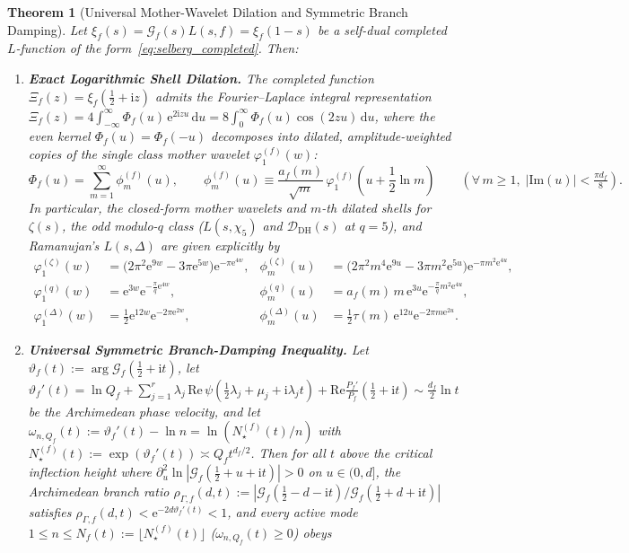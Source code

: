 \documentclass[11pt,reqno]{amsart}
\newtheorem{theorem}{Theorem}[section]
\theoremstyle{definition}
\theoremstyle{remark}
\numberwithin{equation}{section}
\newcommand{\dd}{\mathrm{d}}
\newcommand{\ee}{\mathrm{e}}
\newcommand{\ii}{\mathrm{i}}
\newcommand{\Rea}{\mathrm{Re}}
\newcommand{\Ima}{\mathrm{Im}}
\newcommand{\DHf}{\mathrm{DH}}
\begin{document}
\begin{theorem}[Universal Mother-Wavelet Dilation and Symmetric Branch Damping]\label{thm:mother_wavelet}
Let $\xi_f(s) = \mathcal{G}_f(s)L(s,f) = \xi_f(1-s)$ be a self-dual completed $L$-function of the form~\eqref{eq:selberg_completed}. Then:
\begin{enumerate}[label=\textup{(\roman*)},leftmargin=2.2em]
\item \textbf{Exact Logarithmic Shell Dilation.} The completed function $\Xi_f(z) = \xi_f(\frac{1}{2}+\ii z)$ admits the Fourier--Laplace integral representation $\Xi_f(z) = 4\int_{-\infty}^\infty \Phi_f(u)\,\ee^{2\ii zu}\,\dd u = 8\int_0^\infty \Phi_f(u)\cos(2zu)\,\dd u$, where the even kernel $\Phi_f(u) = \Phi_f(-u)$ decomposes into dilated, amplitude-weighted copies of the single class mother wavelet $\varphi_1^{(f)}(w)$:
\begin{equation}\label{eq:dilation_law}
\Phi_f(u) = \sum_{m=1}^{\infty} \phi_m^{(f)}(u), \qquad \phi_m^{(f)}(u) \equiv \frac{a_f(m)}{\sqrt{m}}\,\varphi_1^{(f)}\!\left(u + \frac{1}{2}\ln m\right) \qquad (\forall\,m \ge 1,\; |\Ima(u)| < \tfrac{\pi d_f}{8}).
\end{equation}
In particular, the closed-form mother wavelets and $m$-th dilated shells for $\zeta(s)$, the odd modulo-$q$ class ($L(s,\chi_5)$ and $\mathcal{D}_{\DHf}(s)$ at $q=5$), and Ramanujan's $L(s,\Delta)$ are given explicitly by
\begin{equation}\label{eq:three_mother_wavelets}
\begin{aligned}
\varphi_1^{(\zeta)}(w) &= \bigl(2\pi^2\ee^{9w} - 3\pi\ee^{5w}\bigr)\ee^{-\pi\ee^{4w}}, & \phi_m^{(\zeta)}(u) &= \bigl(2\pi^2 m^4\ee^{9u} - 3\pi m^2\ee^{5u}\bigr)\ee^{-\pi m^2\ee^{4u}}, \\
\varphi_1^{(q)}(w) &= \ee^{3w}\ee^{-\frac{\pi}{q}\ee^{4w}}, & \phi_m^{(q)}(u) &= a_f(m)\,m\,\ee^{3u}\ee^{-\frac{\pi}{q}m^2\ee^{4u}}, \\
\varphi_1^{(\Delta)}(w) &= \frac{1}{2}\ee^{12w}\ee^{-2\pi\ee^{2w}}, & \phi_m^{(\Delta)}(u) &= \frac{1}{2}\tau(m)\,\ee^{12u}\ee^{-2\pi m\ee^{2u}}.
\end{aligned}
\end{equation}
\item \textbf{Universal Symmetric Branch-Damping Inequality.} Let $\vartheta_f(t) := \arg\mathcal{G}_f(\frac{1}{2}+\ii t)$, let $\vartheta_f'(t) = \ln Q_f + \sum_{j=1}^r \lambda_j\,\Rea\,\psi(\frac{1}{2}\lambda_j + \mu_j + \ii\lambda_j t) + \Rea\frac{P_f'}{P_f}(\frac{1}{2}+\ii t) \sim \frac{d_f}{2}\ln t$ be the Archimedean phase velocity, and let $\omega_{n,Q_f}(t) := \vartheta_f'(t) - \ln n = \ln(N_\star^{(f)}(t)/n)$ with $N_\star^{(f)}(t) := \exp(\vartheta_f'(t)) \asymp Q_f t^{d_f/2}$. Then for all $t$ above the critical inflection height where $\partial_u^2\ln|\mathcal{G}_f(\frac{1}{2}+u+\ii t)| > 0$ on $u \in (0, d]$, the Archimedean branch ratio $\rho_{\Gamma,f}(d,t) := |\mathcal{G}_f(\frac{1}{2}-d-\ii t)/\mathcal{G}_f(\frac{1}{2}+d+\ii t)|$ satisfies $\rho_{\Gamma,f}(d,t) < \ee^{-2d\vartheta_f'(t)} < 1$, and every active mode $1 \le n \le N_f(t) := \lfloor N_\star^{(f)}(t)\rfloor$ ($\omega_{n,Q_f}(t) \ge 0$) obeys

\end{enumerate}
\end{theorem}
\end{document}
